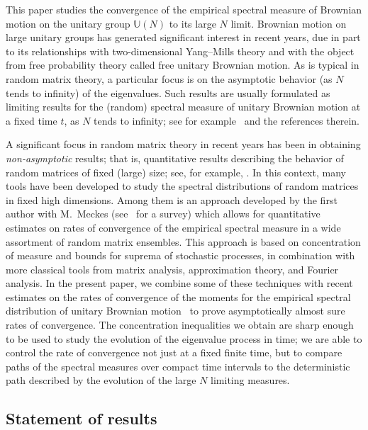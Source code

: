 \documentclass[11pt]{article}
\theoremstyle{definition}
\numberwithin{equation}{section}
\numberwithin{figure}{section}
\numberwithin{table}{section}
\newcommand{\Unitary}[1]{\mathbb{U}\left(#1\right)}
\begin{document}
This paper studies the convergence of the empirical spectral measure of Brownian motion on the unitary group $\Unitary{N}$ to its large $N$ limit. Brownian motion on large unitary groups has generated significant interest in recent years, due in part to its relationships with two-dimensional Yang--Mills theory and with the object from free probability theory called free unitary Brownian motion. As is typical in random matrix theory, a particular focus is on the asymptotic behavior (as $N$ tends to infinity) of the eigenvalues. Such results are usually formulated as limiting results for the (random) spectral measure of unitary Brownian motion at a fixed time $t$, as $N$ tends to infinity; see for example~\cite{Rains1997, Xu1997,Biane1997,Biane1997-2, Levy2008,LevyMaida2010,DHK2013, Kemp2015,CDK2016} and the references therein.

A significant focus in random matrix theory in recent years has been in obtaining
\emph{non-asymptotic} results; that is, quantitative results describing the behavior of random matrices of fixed (large) size; see, for example, \cite{RudVer10}. In this context, many tools have been developed to study the spectral distributions of random matrices in fixed high dimensions. Among them is an approach developed by the first author with M.~Meckes (see~\cite{MM2016} for a survey) which allows for quantitative estimates on rates of convergence of the empirical spectral measure in a wide assortment of random matrix ensembles. This approach is based on concentration of measure and bounds for suprema of stochastic processes, in combination with more classical tools from matrix analysis, approximation theory, and Fourier analysis. In the present paper, we combine some of these techniques with recent estimates on the rates of convergence of the moments for the empirical spectral distribution of unitary Brownian motion~\cite{CDK2016} to prove asymptotically almost sure rates of convergence. The concentration inequalities we obtain are sharp enough to be used to study the evolution of the eigenvalue process in time; we are able to control the rate of convergence not just at a fixed finite time, but to compare paths of the spectral measures over compact time intervals to the deterministic path described by the evolution of the large $N$ limiting measures.


\subsection*{Statement of results}
\end{document}
